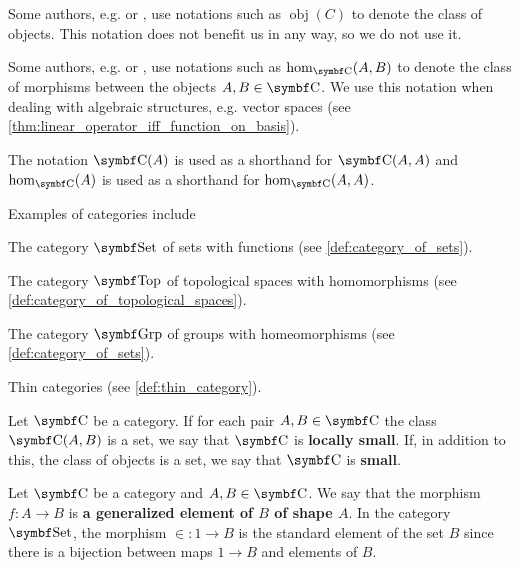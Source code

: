 \begin{remark}\label{remark:category_obj_hom}
  Some authors, e.g. \cite{Leinster2014} or \cite{Aluffi2009}, use notations such as \( \operatorname{obj}(C) \) to denote the class of objects. This notation does not benefit us in any way, so we do not use it.

  Some authors, e.g. \cite{MacLane1994} or \cite{Aluffi2009}, use notations such as \( \operatorname{hom}_{\Bold C}(A, B) \) to denote the class of morphisms between the objects \( A, B \in \Bold C \). We use this notation when dealing with algebraic structures, e.g. vector spaces (see \cref{thm:linear_operator_iff_function_on_basis}).

  The notation \( \Bold{C}(A) \) is used as a shorthand for \( \Bold{C}(A, A) \) and \( \hom_{\Bold C}(A) \) is used as a shorthand for \( \hom_{\Bold C}(A, A) \).
\end{remark}

\begin{example}\label{ex:categories}
  Examples of categories include

  \begin{defenum}
    \item The category \( \Bold{Set} \) of sets with functions (see \cref{def:category_of_sets}).
    \item The category \( \Bold{Top} \) of topological spaces with homomorphisms (see \cref{def:category_of_topological_spaces}).
    \item The category \( \Bold{Grp} \) of groups with homeomorphisms (see \cref{def:category_of_sets}).
    \item Thin categories (see \cref{def:thin_category}).
  \end{defenum}
\end{example}

\begin{definition}\label{def:category_cardinality}
  Let \( \Bold{C} \) be a category. If for each pair \( A, B \in \Bold C \) the class \( \Bold C(A, B) \) is a set, we say that \( \Bold C \) is \textbf{locally small}. If, in addition to this, the class of objects is a set, we say that \( \Bold C \) is \textbf{small}.
\end{definition}

\begin{definition}\label{def:generalized_element}\cite[definition 4.1.25]{Leinster2014}
  Let \( \Bold C \) be a category and \( A, B \in \Bold C \). We say that the morphism \( f: A \to B \) is \textbf{a generalized element of \( B \) of shape \( A \)}. In the category \( \Bold{Set} \), the morphism \( \in : 1 \to B \) is the standard element of the set \( B \) since there is a bijection between maps \( 1 \to B \) and elements of \( B \).
\end{definition}

